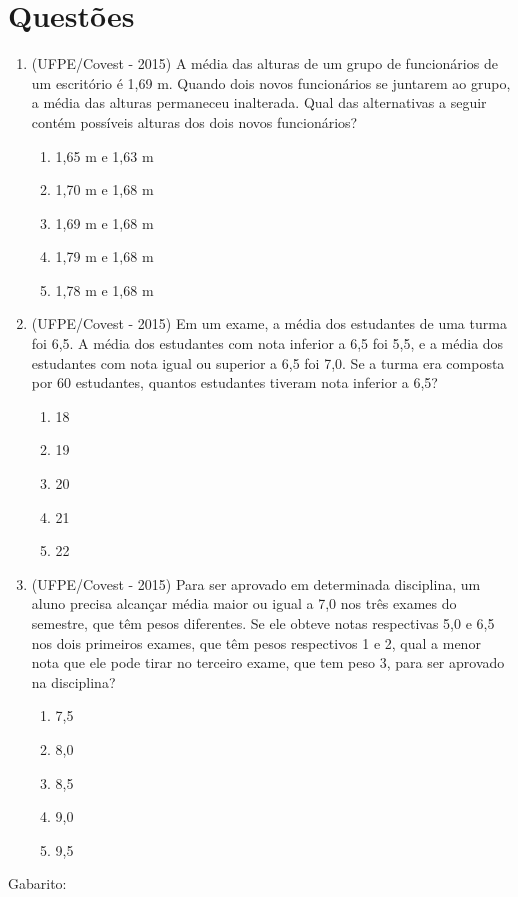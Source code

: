 \section{Questões}
\begin{enumerate}
 \item (UFPE/Covest - 2015) A média das alturas de um grupo de funcionários de um escritório é 1,69 m. Quando dois novos funcionários se juntarem ao grupo, a média das alturas permaneceu inalterada. Qual das alternativas a seguir contém possíveis alturas dos dois novos funcionários?
 \begin{enumerate}
 \item 1,65 m e 1,63 m
 \item 1,70 m e 1,68 m
 \item 1,69 m e 1,68 m
 \item 1,79 m e 1,68 m
 \item 1,78 m e 1,68 m
 \end{enumerate}

 \item (UFPE/Covest - 2015) Em um exame, a média dos estudantes de uma turma foi 6,5. A média dos estudantes com nota inferior a 6,5 foi 5,5, e a média dos estudantes com nota igual ou superior a 6,5 foi 7,0. Se a turma era composta por 60 estudantes, quantos estudantes tiveram nota inferior a 6,5?
 \begin{enumerate}
 \item 18
 \item 19
 \item 20
 \item 21
 \item 22
 \end{enumerate}

 \item (UFPE/Covest - 2015) Para ser aprovado em determinada disciplina, um aluno precisa alcançar média maior ou igual a 7,0 nos três exames do semestre, que têm pesos diferentes. Se ele obteve notas respectivas 5,0 e 6,5 nos dois primeiros exames, que têm pesos respectivos 1 e 2, qual a menor nota que ele pode tirar no terceiro exame, que tem peso 3, para ser aprovado na disciplina?
 \begin{enumerate}
 \item 7,5
 \item 8,0
 \item 8,5
 \item 9,0
 \item 9,5
 \end{enumerate}


\end{enumerate}

Gabarito:
